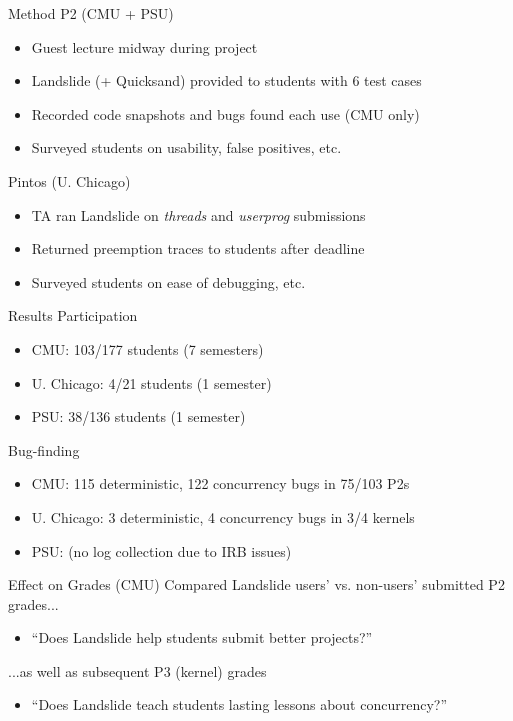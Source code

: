 \documentclass[xcolor=dvipsnames]{beamer}
\begin{document}
\begin{frame}{Method}
	P2 (CMU + PSU)
	\begin{itemize}
		\item Guest lecture midway during project
		\item Landslide (+ Quicksand) provided to students with 6 test cases %
		\item Recorded code snapshots and bugs found each use (CMU only)
		\item Surveyed students on usability, false positives, etc.
	\end{itemize}
	\pause
	\linegap

	Pintos (U. Chicago)
	\begin{itemize}
		\item TA %
			ran Landslide on {\em threads} and {\em userprog} submissions
		\item Returned preemption traces to students after deadline
		\item Surveyed students on ease of debugging, etc.
	\end{itemize}
\end{frame}

\begin{frame}{Results}
	Participation
	\begin{itemize}
		\item CMU: 103/177 students (7 semesters)
		\item U. Chicago: 4/21 students (1 semester)
		\item PSU: 38/136 students (1 semester)
	\end{itemize}
	\linegap

	Bug-finding
	\begin{itemize}
		\item CMU: 115 deterministic, 122 concurrency bugs in 75/103 P2s
		\item U. Chicago: 3 deterministic, 4 concurrency bugs in 3/4 kernels
		\item PSU: (no log collection due to IRB issues)
	\end{itemize}
\end{frame}

\begin{frame}{Effect on Grades (CMU)}
	Compared Landslide users' vs. non-users' submitted P2 grades...
	\begin{itemize}
		\item ``Does Landslide help students submit better projects?''
	\end{itemize}
	\linegap

	...as well as subsequent P3 (kernel) grades
	\begin{itemize}
		\item ``Does Landslide teach students lasting lessons about concurrency?''
	\end{itemize}
\end{frame}
\end{document}
